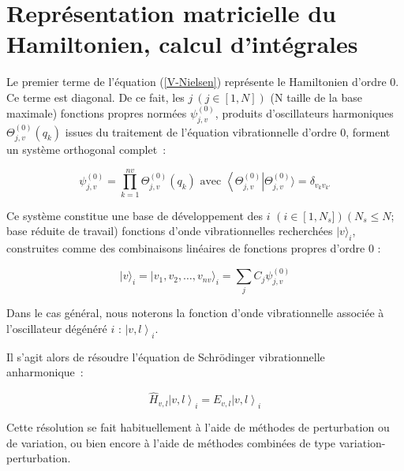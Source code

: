 \section[Représentation matricielle du Hamiltonien]{Représentation matricielle du Hamiltonien, calcul d'intégrales}

Le premier terme de l'équation (\ref{V-Nielsen}) représente le Hamiltonien d'ordre 0. Ce terme est diagonal. De ce fait, les $j \ \left(j\in\left[1,N\right]\right)$ (N taille de la base maximale) fonctions propres normées $\psi^{(0)}_{j,v}$, produits  d'oscillateurs harmoniques $\Theta^{(0)}_{j,v}(q_k)$ issues du traitement de l'équation vibrationnelle d'ordre 0, forment un système orthogonal complet~:

\begin{equation}
\psi^{(0)}_{j,v} = \prod^{nv}_{k=1} \Theta^{(0)}_{j,v}(q_k) \text{ avec } \left\langle \Theta^{(0)}_{j,v} \right| \Theta^{(0)}_{j,v} \rangle = \delta_{v_k v_{k'}}
\end{equation}

Ce système constitue une base de développement des $i$ $\left(i\in\left[1, N_s\right.]\right) \left(N_s\leq N \right.$; base réduite de travail) fonctions d'onde vibrationnelles recherchées $\left.|v\right.\rangle_i$, construites comme des combinaisons linéaires de fonctions propres d'ordre 0 :

\begin{equation}
\left.|v\right.\rangle_i = \left.|v_1, v_2, \ldots, v_{nv}\right.\rangle_i = \sum_j C_j \psi^{(0)}_{j,v}
\end{equation}

Dans le cas général, nous noterons la fonction d'onde vibrationnelle associée à l'oscillateur dégénéré $i$ : $\left.\left.\right|v,l\right\rangle_i$.

Il s'agit alors de résoudre l'équation de Schr\"{o}dinger vibrationnelle anharmonique~:

\begin{equation} \label{Eq-Schrod-anhar}
\hat{H}_{v,l} \left.\left.\right|v,l\right\rangle_i = E_{v,l} \left.\left.\right|v,l\right\rangle_i
\end{equation}

Cette résolution se fait habituellement à l'aide de méthodes de perturbation ou de variation, ou bien encore à l'aide de méthodes combinées de type variation-perturbation.

